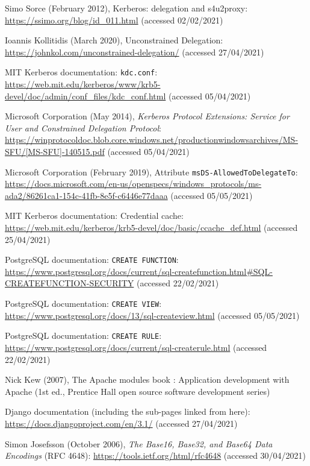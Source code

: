 \documentclass[12pt]{report}
\begin{document}
\begin{thebibliography}{99}
 Simo Sorce (February 2012), Kerberos: delegation and s4u2proxy: \url{https://ssimo.org/blog/id_011.html} (accessed 02/02/2021)

 Ioannis Kollitidis (March 2020), Unconstrained Delegation: \url{https://johnkol.com/unconstrained-delegation/} (accessed 27/04/2021)

 MIT Kerberos documentation: \texttt{kdc.conf}: \url{https://web.mit.edu/kerberos/www/krb5-devel/doc/admin/conf_files/kdc_conf.html} (accessed 05/04/2021)

 Microsoft Corporation (May 2014), \textit{Kerberos Protocol Extensions: Service for User and Constrained Delegation Protocol}: \url{https://winprotocoldoc.blob.core.windows.net/productionwindowsarchives/MS-SFU/[MS-SFU]-140515.pdf} (accessed 05/04/2021)

 Microsoft Corporation (February 2019), Attribute \texttt{msDS-AllowedToDelegateTo}: \url{https://docs.microsoft.com/en-us/openspecs/windows_protocols/ms-ada2/86261ca1-154c-41fb-8e5f-c6446e77daaa} (accessed 05/05/2021)

 MIT Kerberos documentation: Credential cache: \url{https://web.mit.edu/kerberos/krb5-devel/doc/basic/ccache_def.html} (accessed 25/04/2021)

 PostgreSQL documentation: \texttt{CREATE FUNCTION}: \url{https://www.postgresql.org/docs/current/sql-createfunction.html#SQL-CREATEFUNCTION-SECURITY} (accessed 22/02/2021)

 PostgreSQL documentation: \texttt{CREATE VIEW}: \url{https://www.postgresql.org/docs/13/sql-createview.html} (accessed 05/05/2021)

 PostgreSQL documentation: \texttt{CREATE RULE}: \url{https://www.postgresql.org/docs/current/sql-createrule.html} (accessed 22/02/2021)

 Nick Kew (2007), The Apache modules book : Application development with Apache (1st ed., Prentice Hall open source software development series)

 Django documentation (including the sub-pages linked from here): \url{https://docs.djangoproject.com/en/3.1/} (accessed 27/04/2021)

 Simon Josefsson (October 2006), \textit{The Base16, Base32, and Base64 Data Encodings} (RFC 4648): \url{https://tools.ietf.org/html/rfc4648} (accessed 30/04/2021)


\end{thebibliography}
\end{document}
